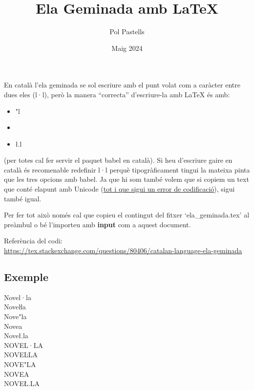 \documentclass{article}
\title{Ela Geminada amb \LaTeX}
\date{Maig 2024}
\author{Pol Pastells}
\begin{document}
\maketitle

En català l'ela geminada se sol escriure amb el punt volat com a caràcter entre dues eles (l·l), però la manera ``correcta'' d'escriure-la amb \LaTeX{} és amb:
\begin{itemize}
    \item "l 
    \item \lgem{}
    \item \l.l
\end{itemize}
(per totes cal fer servir el paquet babel en català). Si heu d'escriure gaire en català és recomenable redefinir l·l perquè tipogràficament tingui la mateixa pinta que les tres opcions amb babel.
Ja que hi som també volem que si copiem un text que conté elapunt amb Unicode (\href{http://www.l·l.cat/info/formes-erronies-descriure-la-ela-geminada}{tot i que sigui un error de codificació}), sigui també igual.

Per fer tot això només cal que copieu el contingut del fitxer `ela\_geminada.tex' al preàmbul o bé l'importeu amb \textbf{input} com a aquest document.

Referència del codi:\\
\url{https://tex.stackexchange.com/questions/80406/catalan-language-ela-geminada}

\subsection*{Exemple}
Novel·la \\
Noveŀla \\
Nove"la \\
Nove\lgem a \\
Nove\l.la \\
NOVEL·LA \\
NOVEĿLA \\
NOVE"LA \\
NOVE\Lgem A \\
NOVE\L.LA
\end{document}
